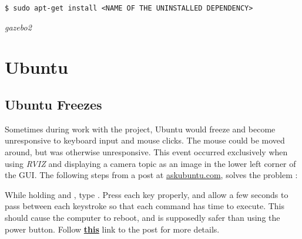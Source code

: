 \begin{verbatim}
$ sudo apt-get install <NAME OF THE UNINSTALLED DEPENDENCY>
\end{verbatim}

\textit{gazebo2} 

\section{Ubuntu}

\subsection{Ubuntu Freezes}

Sometimes during work with the project, Ubuntu would freeze and become unresponsive to keyboard input and mouse clicks. The mouse could be moved around, but was otherwise unresponsive. This event occurred exclusively when using \textit{RVIZ} and displaying a camera topic as an image in the lower left corner of the \ac{GUI}. The following steps from a post at \href{http://askubuntu.com/questions/4408/what-should-i-do-when-ubuntu-freezes/36717#36717}{askubuntu.com}, solves the problem \cite{Reboot_Ubuntu}:

While holding  and , type . Press each key properly, and allow a few seconds to pass between each keystroke so that each command has time to execute. This should cause the computer to reboot, and is supposedly safer than using the power button. Follow \href{http://askubuntu.com/questions/4408/what-should-i-do-when-ubuntu-freezes/36717#36717}{\textbf{this}} link to the post for more details.